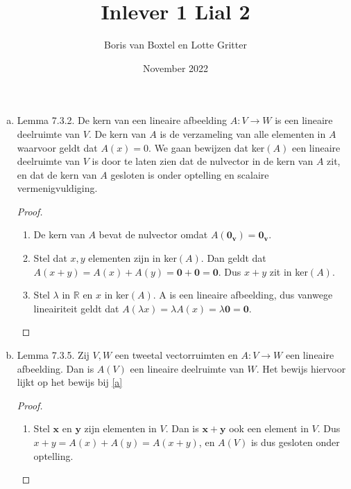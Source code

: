 \documentclass[12pt, a4paper]{article}
\title{Inlever 1 Lial 2}
\author{Boris van Boxtel en Lotte Gritter}
\date{November 2022}
\begin{document}
\maketitle 

\begin{enumerate}[(a).]
    \item \label{a}
    Lemma 7.3.2. De kern van een lineaire afbeelding $A: V \rightarrow W$ is een lineaire deelruimte van $V$. \newline 
    De kern van $A$ is de verzameling van alle elementen in $A$ waarvoor geldt dat $A(x)=0$. We gaan bewijzen dat ker$(A)$ een lineaire deelruimte van $V$ is door te laten zien dat de nulvector in de kern van $A$ zit, en dat de kern van $A$ gesloten is onder optelling en scalaire vermenigvuldiging.

        \begin{proof}\leavevmode
            \begin{enumerate}[1.]
                \item De kern van $A$ bevat de nulvector omdat $A(\mathbf{0_v})=\mathbf{0_v}$.
                \item Stel dat $x,y$ elementen zijn in ker$(A)$. Dan geldt dat $A(x+y)=A(x)+A(y)= \mathbf{0} + \mathbf{0}=\mathbf{0}$. Dus $x+y$ zit in ker$(A)$. 
                
                \item Stel $\lambda$ in $\mathbb{R}$ en $x$ in ker$(A)$. A is een lineaire afbeelding, dus vanwege lineairiteit geldt dat $A(\lambda x)=\lambda A(x) = \lambda \mathbf{0} = \mathbf{0}$.
            \end{enumerate}
        \end{proof}

    \item \label{b}
    Lemma 7.3.5. Zij $V, W$ een tweetal vectorruimten en $A: V \rightarrow W$ een lineaire afbeelding. Dan is $A(V)$ een lineaire deelruimte van $W$.
    \newline Het bewijs hiervoor lijkt op het bewijs bij \ref{a}

        \begin{proof}\leavevmode
          \begin{enumerate}[1.]
            \item Stel $\mathbf{x}$ en $\mathbf{y}$ zijn elementen in $V$. Dan is $\mathbf{x+y}$ ook een element in $V$. Dus $x+y=A(x)+A(y)=A(x+y)$, en $A(V)$ is dus gesloten onder optelling.


\end{enumerate}
\end{proof}
\end{enumerate}
\end{document}
